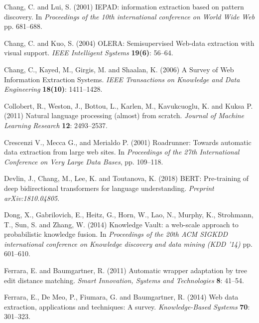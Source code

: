 \documentclass{nle}
\begin{document}
\begin{thebibliography}{}
Chang, C. and Lui, S. (2001)
IEPAD: information extraction based on pattern discovery.
In {\it Proceedings of the 10th international conference on World Wide Web}
pp. 681--688.

Chang, C. and Kuo, S. (2004)
OLERA: Semisupervised Web-data extraction with visual support.
{\it IEEE Intelligent Systems}
{\bf 19(6)}: 56--64.

Chang, C., Kayed, M., Girgis, M. and Shaalan, K. (2006)
A Survey of Web Information Extraction Systems.
{\it IEEE Transactions on Knowledge and Data Engineering}
{\bf 18(10)}: 1411--1428.

Collobert, R., Weston, J., Bottou, L., Karlen, M., Kavukcuoglu, K. and Kuksa P. (2011)
Natural language processing (almost) from scratch.
{\it Journal of Machine Learning Research}
{\bf 12}: 2493--2537.

Crescenzi V., Mecca G., and Merialdo P. (2001)
Roadrunner: Towards automatic data extraction from large web sites.
In {\it Proceedings of the 27th International Conference on Very Large Data Bases}, 
pp. 109--118.

Devlin, J., Chang, M., Lee, K. and Toutanova, K. (2018)
{BERT}: Pre-training of deep bidirectional transformers for language understanding.
{\it Preprint arXiv:1810.04805}.

Dong, X., Gabrilovich, E., Heitz, G., Horn, W., Lao, N., Murphy, K., Strohmann, T., Sun, S. and Zhang, W. (2014)
Knowledge Vault: a web-scale approach to probabilistic knowledge fusion.
In {\it Proceedings of the 20th ACM SIGKDD international conference on Knowledge discovery and data mining (KDD '14)}
pp. 601--610.

Ferrara, E. and Baumgartner, R. (2011)
Automatic wrapper adaptation by tree edit distance matching.
{\it Smart Innovation, Systems and Technologies}
{\bf 8}: 41--54.

Ferrara, E., De Meo, P., Fiumara, G. and Baumgartner, R. (2014)
Web data extraction, applications and techniques: A survey.
{\it Knowledge-Based Systems}
{\bf 70}: 301--323.


\end{thebibliography}
\end{document}
